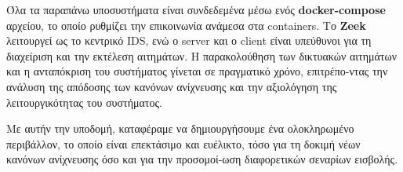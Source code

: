 Όλα τα παραπάνω υποσυστήματα είναι συνδεδεμένα μέσω ενός \textbf{docker-compose} αρχείου, το οποίο ρυθμίζει την επικοινωνία ανάμεσα στα containers. Το \textbf{Zeek} λειτουργεί ως το κεντρικό IDS, ενώ ο server και ο client είναι υπεύθυνοι για τη διαχείριση και την εκτέλεση αιτημάτων. Η παρακολούθηση των δικτυακών αιτημάτων και η ανταπόκριση του συστήματος γίνεται σε πραγματικό χρόνο, επιτρέπο-ντας την ανάλυση της απόδοσης των κανόνων ανίχνευσης και την αξιολόγηση της λειτουργικότητας του συστήματος.

Με αυτήν την υποδομή, καταφέραμε να δημιουργήσουμε ένα ολοκληρωμένο περιβάλλον, το οποίο είναι επεκτάσιμο και ευέλικτο, τόσο για τη δοκιμή νέων κανόνων ανίχνευσης όσο και για την προσομοί-ωση διαφορετικών σεναρίων εισβολής.
